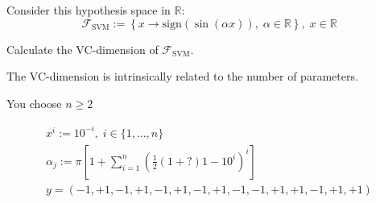 \begin{exercise}{}{}
  Consider this hypothesis space in $\mathds{R}$:
  \begin{equation*}
    \mathcal{F}_\text{SVM} := \left\{
      x \to \text{sign}\left( \sin (\alpha x)\right),\; \alpha \in \mathds{R}
    \right\},\; x \in \mathds{R}
  \end{equation*}

  Calculate the VC-dimension of $\mathcal{F}_\text{SVM}$.

  \tcblower

  The VC-dimension is intrinsically related to the number
  of parameters.

  You choose $n \geq 2$

  \begin{align*}
    x^i := 10^{-i},\; i \in \{1, \ldots, n\} \\
    \alpha_j := \pi \left[
      1 + \sum_{i=1}^n \left( \frac{1}{2}(1 + ?)1-10^i \right)^i
    \right] \\
    y = (-1, +1, -1, +1, -1, +1, -1, +1, -1, -1,  +1, +1, -1, +1, +1)
  \end{align*}

\end{exercise}
